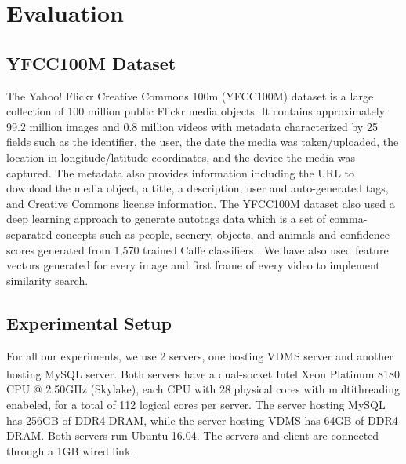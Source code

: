 \section{Evaluation}
\label{eval}

\subsection{YFCC100M Dataset}
\label{dataset}

The Yahoo! Flickr Creative Commons 100m (YFCC100M) dataset is a
large collection of 100 million public Flickr media objects.
It contains approximately 99.2 million images and 0.8 million videos
with metadata characterized by 25 fields such as the identifier,
the user, the date the media was taken/uploaded,
the location in longitude/latitude coordinates,
and the device the media was captured.
The metadata also provides information including the URL to
download the media object, a title, a description, user and
auto-generated tags, and Creative Commons license information.
The YFCC100M dataset also used a deep learning approach to generate
autotags data which is a set of comma-separated concepts such as people,
scenery, objects, and animals and confidence scores
generated from 1,570 trained Caffe classifiers \cite{Thomee_2016}.
We have also used feature vectors generated for every image and first frame
of every video \cite{features} to implement similarity search.

\subsection{Experimental Setup}

For all our experiments, we use 2 servers, one hosting VDMS server and
another hosting MySQL server. Both servers have a dual-socket
Intel\textsuperscript{\textregistered}
Xeon\textsuperscript{\textregistered} Platinum 8180 CPU @ 2.50GHz (Skylake),
each CPU with 28 physical cores with multithreading enabeled,
for a total of 112 logical cores per server.
The server hosting MySQL has 256GB of DDR4 DRAM, while the server hosting VDMS
has 64GB of DDR4 DRAM. Both servers run Ubuntu 16.04.
The servers and client are connected through a 1GB wired link.

